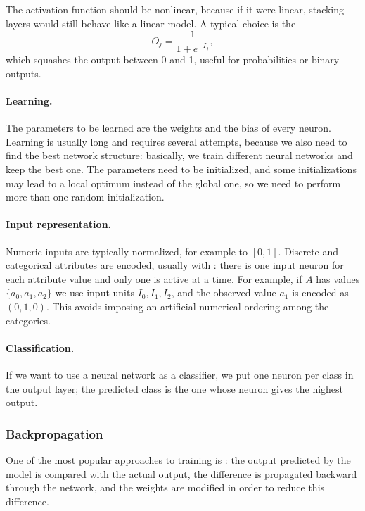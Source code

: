 The activation function should be nonlinear, because if it were linear, stacking layers would still behave like a linear model. A typical choice is the 
\[
  O_j = \frac{1}{1 + e^{-I_j}},
\]
which squashes the output between 0 and 1, useful for probabilities or binary outputs.

\paragraph{Learning.} The parameters to be learned are the weights and the bias of every neuron. Learning is usually long and requires several attempts, because we also need to find the best network structure: basically, we train different neural networks and keep the best one. The parameters need to be initialized, and some initializations may lead to a local optimum instead of the global one, so we need to perform more than one random initialization.

\paragraph{Input representation.} Numeric inputs are typically normalized, for example to $[0,1]$. Discrete and categorical attributes are encoded, usually with : there is one input neuron for each attribute value and only one is active at a time. For example, if $A$ has values $\{a_0, a_1, a_2\}$ we use input units $I_0, I_1, I_2$, and the observed value $a_1$ is encoded as $(0, 1, 0)$. This avoids imposing an artificial numerical ordering among the categories.

\paragraph{Classification.} If we want to use a neural network as a classifier, we put one neuron per class in the output layer; the predicted class is the one whose neuron gives the highest output.

\subsubsection{Backpropagation}

One of the most popular approaches to training is : the output predicted by the model is compared with the actual output, the difference is propagated backward through the network, and the weights are modified in order to reduce this difference.

